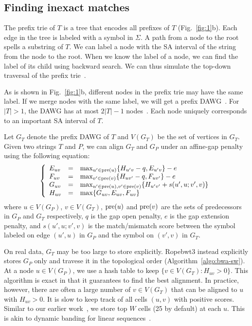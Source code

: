 \documentclass[webpdf,contemporary,large,namedate]{oup-authoring-template}%
\begin{document}
\subsection{Finding inexact matches}

The prefix trie of $T$ is a tree that encodes all prefixes of $T$ (Fig.~\ref{fig:1}b).
Each edge in the tree is labeled with a symbol in $\Sigma$.
A path from a node to the root spells a substring of $T$.
We can label a node with the SA interval of the string from the node to the root.
When we know the label of a node, we can find the label of its child using backward search.
We can thus simulate the top-down traversal of the prefix trie~\citep{Lam:2008aa}.

As is shown in Fig.~\ref{fig:1}b, different nodes in the prefix trie may have the same label.
If we merge nodes with the same label, we will get a prefix DAWG~\citep{DBLP:journals/eatcs/BlumerBEHM83,Li:2010fk}.
For $|T|>1$, the DAWG has at most $2|T|-1$ nodes~\citep{DBLP:conf/icalp/BlumerBEHM84}.
Each node uniquely corresponds to an important SA interval of $T$.

Let $G_T$ denote the prefix DAWG of $T$ and $V(G_T)$ be the set of vertices in $G_T$.
Given two strings $T$ and $P$, we can align $G_T$ and $G_P$ under an affine-gap penalty
using the following equation:
$$
\left\{\begin{array}{lll}
E_{uv}&=&\max_{u'\in{\rm pre}(u)}\{H_{u'v}-q,E_{u'v}\}-e\\
F_{uv}&=&\max_{v'\in{\rm pre}(v)}\{H_{uv'}-q,F_{uv'}\}-e\\
G_{uv}&=&\max_{u'\in{\rm pre}(u),v'\in{\rm pre}(v)}\{H_{u'v'}+s(u',u;v',v)\}\\
H_{uv}&=&\max\{G_{uv},E_{uv},F_{uv}\}\\
\end{array}\right.
$$
where $u\in V(G_P)$, $v\in V(G_T)$,
${\rm pre}(u)$ and ${\rm pre}(v)$ are the sets of predecessors in $G_P$ and $G_T$ respectively,
$q$ is the gap open penalty, $e$ is the gap extension penalty,
and $s(u',u;v',v)$ is the match/mismatch score between the symbol labeled on edge $(u',u)$ in $G_P$
and the symbol on $(v',v)$ in $G_T$.

On real data, $G_T$ may be too large to store explicitly.
Ropebwt3 instead explicitly stores $G_P$ only and travese it in the topological order (Algorithm~\ref{algo:bwa-sw}).
At a node $u\in V(G_P)$, we use a hash table to keep $\{v\in V(G_T):H_{uv}>0\}$.
This algorithm is exact in that it guarantees to find the best alignment.
In practice, however, there are often a large number of $v\in V(G_T)$ that can be aligned to $u$ with $H_{uv}>0$.
It is slow to keep track of all cells $(u,v)$ with positive scores.
Similar to our earlier work~\citep{Li:2010fk}, we store top $W$ cells (25 by default) at each $u$.
This is akin to dynamic banding for linear sequences~\citep{Suzuki:2018aa}.
\end{document}
